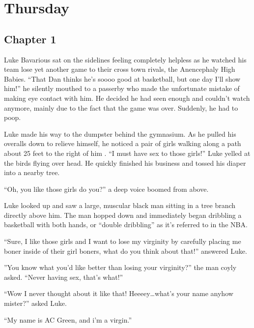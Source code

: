 \chapter{Thursday}

\section*{Chapter 1}

Luke Bavarious sat on the sidelines feeling completely helpless as
he watched his team lose yet another game to their cross town
rivals, the Anencephaly High Babies. ``That Dan thinks he's soooo
good at basketball, but one day I'll show him!'' he silently
mouthed to a passerby who made the unfortunate mistake of making
eye contact with him. He decided he had seen enough and couldn't
watch anymore, mainly due to the fact that the game was over.
Suddenly, he had to poop.



Luke made his way to the dumpster behind the gymnasium. As he
pulled his overalls down to relieve himself, he noticed a pair of
girls walking along a path about 25 feet to the right of him . ``I
must have sex to those girls!'' Luke yelled at the birds flying over
head. He quickly finished his business and tossed his diaper into a
nearby tree.



``Oh, you like those girls do you?'' a deep voice boomed from
above.



Luke looked up and saw a large, muscular black man sitting in a
tree branch directly above him. The man hopped down and immediately
began dribbling a basketball with both hands, or ``double dribbling''
as it's referred to in the NBA.



``Sure, I like those girls and I want to lose my virginity by
carefully placing me boner inside of their girl boners, what do you
think about that!'' answered Luke.



''You know what you'd like better than losing your virginity?''
the man coyly asked. ``Never having sex, that's what!''



``Wow I never thought about it like that! Heeeey{\ldots}what's your
name anyhow mister?'' asked Luke.



``My name is AC Green, and i'm a virgin.''



